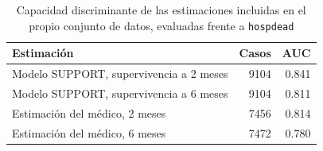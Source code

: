 \begin{table}[H]
\centering
\caption{Capacidad discriminante de las estimaciones incluidas en el propio conjunto de datos, evaluadas frente a \texttt{hospdead}}
\label{tab:referencia}
\small
\begin{tabular}{p{6.4cm} r r}
\toprule
\textbf{Estimación} & \textbf{Casos} & \textbf{AUC} \\
\midrule
Modelo SUPPORT, supervivencia a 2 meses & 9104 & 0.841 \\
Modelo SUPPORT, supervivencia a 6 meses & 9104 & 0.811 \\
Estimación del médico, 2 meses & 7456 & 0.814 \\
Estimación del médico, 6 meses & 7472 & 0.780 \\
\bottomrule
\end{tabular}
\end{table}

